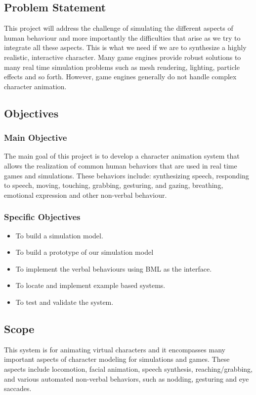 \documentclass[options]{article}
\begin{document}
\subsection{\textbf{Problem Statement}}
This project will address the challenge of simulating the different aspects of human behaviour and more importantly the difficulties that arise as we try to integrate all these aspects. This is what we need if we are to synthesize a highly realistic, interactive character. \bigbreak
Many game engines provide robust solutions to many real time simulation problems such as mesh rendering, lighting, particle effects and so forth. However, game engines generally do not handle complex character animation.


\subsection{\textbf{Objectives}}


\subsubsection{\textbf{Main Objective}} 
The main goal of this project is to develop a character animation system that allows the realization of common human behaviors that are used in real time games and simulations. \bigbreak
These behaviors include: synthesizing speech, responding to speech, moving, touching, grabbing, gesturing, and gazing, breathing, emotional expression and other non-verbal behaviour.


\subsubsection{\textbf{Specific Objectives}}

\begin{itemize}
  \item To build a simulation model.
  \item To build a prototype of our simulation model
  \item To implement the verbal behaviours using BML as the interface.
  \item To locate and implement example based systems.
  \item To test and validate the system.
\end{itemize}


\subsection{\textbf{Scope}}
This system is for animating virtual characters and it encompasses many important aspects of character modeling for simulations and games. These aspects include locomotion, facial animation, speech synthesis, reaching/grabbing, and various automated non-verbal behaviors, such as nodding, gesturing and eye saccades.
\end{document}
